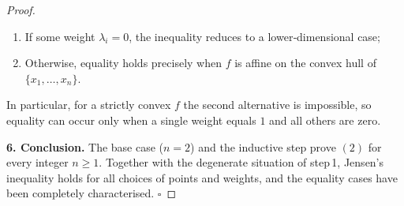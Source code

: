 \begin{proof}
\begin{enumerate}
  \item If some weight \(\lambda_{i}=0\), the inequality reduces to a lower‑dimensional case;
  \item Otherwise, equality holds precisely when \(f\) is affine on the convex hull of
        \(\{x_{1},\dots ,x_{n}\}\).
\end{enumerate}
In particular, for a strictly convex \(f\) the second alternative is impossible,
so equality can occur only when a single weight equals \(1\) and all others are zero.

\medskip\noindent\textbf{6. Conclusion.}  
The base case (\(n=2\)) and the inductive step prove \((2)\) for every integer
\(n\ge 1\).  Together with the degenerate situation of step 1, Jensen’s inequality
holds for all choices of points and weights, and the equality cases have been
completely characterised. \(\square\)
\end{proof}